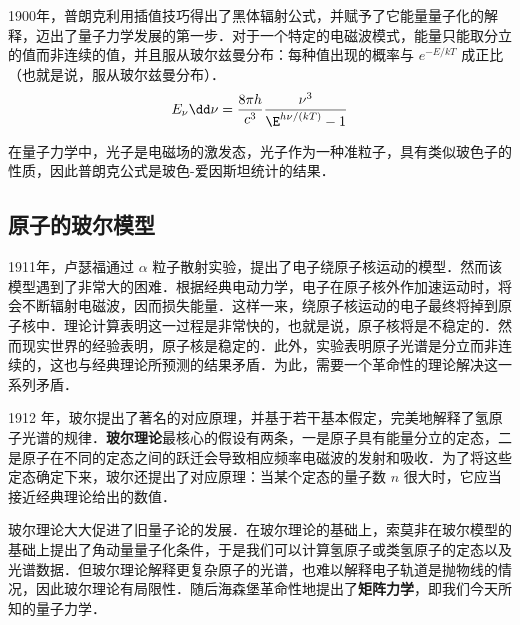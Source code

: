 1900年，普朗克利用插值技巧得出了黑体辐射公式，并赋予了它能量量子化的解释，迈出了量子力学发展的第一步．对于一个特定的电磁波模式，能量只能取分立的值而非连续的值，并且服从玻尔兹曼分布：每种值出现的概率与 $e^{-E/kT}$ 成正比（也就是说，服从玻尔兹曼分布）．
\begin{equation}
E_\nu \dd \nu=\frac{8\pi h}{c^3}\frac{\nu^3}{\E^{h\nu/(k T)} - 1}
\end{equation}

在量子力学中，光子是电磁场的激发态，光子作为一种准粒子，具有类似玻色子的性质，因此普朗克公式是玻色-爱因斯坦统计的结果．

\subsection{原子的玻尔模型}
1911年，卢瑟福通过 $\alpha$ 粒子散射实验，提出了电子绕原子核运动的模型．然而该模型遇到了非常大的困难．根据经典电动力学，电子在原子核外作加速运动时，将会不断辐射电磁波，因而损失能量．这样一来，绕原子核运动的电子最终将掉到原子核中．理论计算表明这一过程是非常快的，也就是说，原子核将是不稳定的．然而现实世界的经验表明，原子核是稳定的．此外，实验表明原子光谱是分立而非连续的，这也与经典理论所预测的结果矛盾．为此，需要一个革命性的理论解决这一系列矛盾．

1912 年，玻尔提出了著名的对应原理，并基于若干基本假定，完美地解释了氢原子光谱的规律．\textbf{玻尔理论}最核心的假设有两条，一是原子具有能量分立的定态，二是原子在不同的定态之间的跃迁会导致相应频率电磁波的发射和吸收．为了将这些定态确定下来，玻尔还提出了对应原理：当某个定态的量子数 $n$ 很大时，它应当接近经典理论给出的数值．

玻尔理论大大促进了旧量子论的发展．在玻尔理论的基础上，索莫非在玻尔模型的基础上提出了角动量量子化条件，于是我们可以计算氢原子或类氢原子的定态以及光谱数据．但玻尔理论解释更复杂原子的光谱，也难以解释电子轨道是抛物线的情况，因此玻尔理论有局限性．随后海森堡革命性地提出了\textbf{矩阵力学}，即我们今天所知的量子力学．